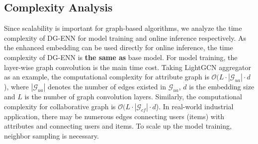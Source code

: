 \subsection{Complexity Analysis}
Since scalability is important for graph-based algorithms, we analyze the time complexity of DG-ENN for model training and online inference respectively.
As the enhanced embedding can be used directly for online inference, the time complexity of DG-ENN is \textbf{the same as} base model.
For model training, the layer-wise graph convolution is the main time cost.
Taking LightGCN aggregator as an example, the computational complexity for attribute graph is $\mathcal{O}(L \cdot |\mathcal{G}_{ua}| \cdot d$), where $|\mathcal{G}_{ua}|$ denotes the number of edges existed in $\mathcal{G}_{ua}$, $d$ is the embedding size and $L$ is the number of graph convolution layers.
Similarly, the computational complexity for collaborative graph is $\mathcal{O}(L \cdot |\mathcal{G}_{cf}| \cdot d$).
In real-world industrial application, there may be numerous edges connecting users (items) with attributes and connecting users and items.
To scale up the model training, neighbor sampling is necessary.


